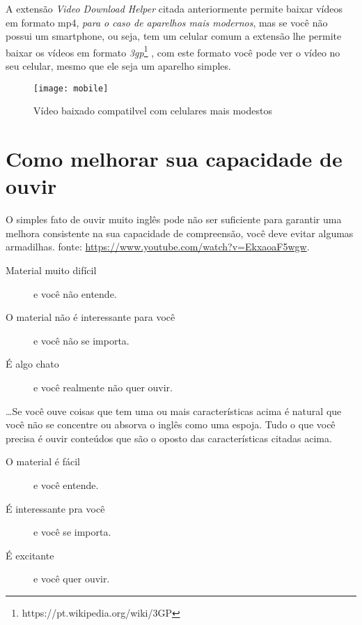 A extensão \emph{Video Download Helper} citada anteriormente permite baixar
vídeos em formato mp4, \emph{para o caso de aparelhos mais modernos},
mas se você não possui um smartphone, ou seja, tem um celular comum a
extensão lhe permite baixar os vídeos em formato
\emph{3gp}\footnote{https://pt.wikipedia.org/wiki/3GP} , com este
formato você pode ver o vídeo no seu celular, mesmo que ele seja um
aparelho simples.

\begin{figure}[h!]
	\centering
	\caption{Vídeo baixado compatilvel com celulares mais modestos}
	\texttt{[image: mobile]}
\end{figure}


\section{Como melhorar sua capacidade de ouvir}
\label{sec:como_melhorar_sua_capacidade_de_ouvir}

O simples fato de ouvir muito inglês pode não ser suficiente para
garantir uma melhora consistente na sua capacidade de compreensão,
você deve evitar algumas armadilhas. {\footnotesize {} fonte:
\href{https://www.youtube.com/watch?v=EkxaoaF5wgw}{https://www.youtube.com/watch?v=EkxaoaF5wgw}}.

\begin{description}
	\item[Material muito difícil] e você não entende.
	\item[O material não é interessante para você] e você não se importa.
	\item[É algo chato] e você realmente não quer ouvir.
\end{description}

\dots Se você ouve coisas que tem uma ou mais características acima
é natural que você não se concentre ou absorva o inglês como uma espoja.
Tudo o que você precisa é ouvir conteúdos que são o oposto das características
citadas acima.

\begin{description}
	\item[O material é fácil] e você entende.
	\item[É interessante pra você] e você se importa.
	\item[É excitante] e você quer ouvir.
\end{description}


